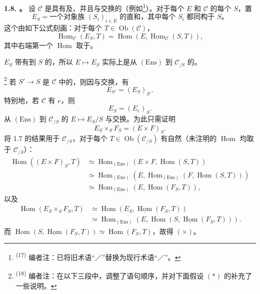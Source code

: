 \textbf{1.8. 。} 设 $\mathcal C$ 是具有及、并且与交换的（例如\footnote{\textsuperscript{(17)} 编者注：已将旧术语“／”替换为现行术语“／”。}）。对于每个 $E$ 和 $\mathcal C$ 的每个 $S$，置
\[
E_S=\text{一个对象族 $(S_i)_{i\in E}$ 的直和，其中每个 $S_i$ 都同构于 $S$。}\tag{1.8.1}
\]
这个由如下公式刻画：对于每个 $T\in\operatorname{Ob}(\mathcal C)$，
\[
\operatorname{Hom}_{\mathcal C}(E_S,T)=\operatorname{Hom}(E,\operatorname{Hom}_{\mathcal C}(S,T)),\tag{1.8.2}
\]
其中右端第一个 $\operatorname{Hom}$ 取于。

 $E_S$ 带有到 $S$ 的，所以 $E\mapsto E_S$ 实际上是从 $(\mathrm{Ens})$ 到 $\mathcal C_{/S}$ 的。

\footnote{\textsuperscript{(18)} 编者注：在以下三段中，调整了语句顺序，并对下面假设 $(*)$ 的补充了一些说明。}
若 $S'\to S$ 是 $\mathcal C$ 中的，则因与交换，有
\[
E_{S'}=(E_S)_{S'}.
\]
特别地，若 $\mathcal C$ 有 $e$，则
\[
E_S=(E_e)_S.
\]
从 $(\mathrm{Ens})$ 到 $\mathcal C_{/S}$ 的 $E\mapsto E_S/S$ 与交换。为此只需证明
\[
E_S\times_SF_S=(E\times F)_S.\tag{$\times$}
\]
将 1.7 的结果用于 $\mathcal C_{/S}$，对于每个 $T\in\operatorname{Ob}(\mathcal C_{/S})$ 有自然（未注明的 $\operatorname{Hom}$ 均取于 $\mathcal C_{/S}$）：
\[
\begin{aligned}
\operatorname{Hom}((E\times F)_S,T)
&\simeq\operatorname{Hom}_{(\mathrm{Ens})}(E\times F,\operatorname{Hom}(S,T))\\
&\simeq\operatorname{Hom}_{(\mathrm{Ens})}(E,\operatorname{Hom}_{(\mathrm{Ens})}(F,\operatorname{Hom}(S,T)))\\
&\simeq\operatorname{Hom}_{(\mathrm{Ens})}(E,\operatorname{Hom}(F_S,T)),
\end{aligned}
\]
以及
\[
\begin{aligned}
\operatorname{Hom}(E_S\times_SF_S,T)
&\simeq\operatorname{Hom}(E_S,\underline{\operatorname{Hom}}(F_S,T))\\
&\simeq\operatorname{Hom}_{(\mathrm{Ens})}(E,\operatorname{Hom}(S,\underline{\operatorname{Hom}}(F_S,T))).
\end{aligned}
\]
而 $\operatorname{Hom}(S,\underline{\operatorname{Hom}}(F_S,T))\simeq\operatorname{Hom}(F_S,T)$，故得 $(\times)$。

